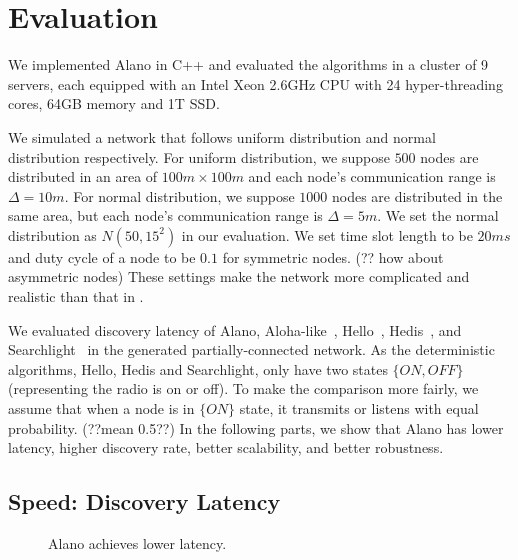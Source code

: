 \section{Evaluation}
\label{Evaluation}


We implemented Alano in C++ and evaluated the algorithms in a cluster of 9 servers,
each equipped with an Intel Xeon 2.6GHz CPU with 24 hyper-threading cores, 64GB memory and 1T SSD.

We simulated a network that follows uniform distribution and normal distribution respectively.
For uniform distribution, we suppose $500$ nodes are distributed in an area of $100m \times 100m$ and each node's communication range is $\Delta = 10m$. For normal distribution, we suppose $1000$ nodes are distributed in the same area, but each node's communication range is $\Delta = 5m$. We set the normal distribution as $N(50,15^2)$ in our evaluation.
We set time slot length to be $20ms$ and duty cycle of a node to be $0.1$ for symmetric nodes.
(?? how about asymmetric nodes)
These settings make the network more complicated and realistic than that in
\cite{wang2015blinddate, qiu2016talk, sun2014hello, bakht2012searchlight,
chen2015heterogeneous, kandhalu2010u, you2011aloha,
mcglynn2001birthday, song2014probabilistic, vasudevan2009neighbor}.



We evaluated discovery latency of Alano, Aloha-like~\cite{you2011aloha}, Hello~\cite{sun2014hello}, Hedis~\cite{chen2015heterogeneous}, and Searchlight~\cite{bakht2012searchlight} in the generated partially-connected network. 
As the deterministic algorithms, Hello, Hedis and Searchlight, only have two states $\{ON, OFF\}$ (representing the radio is on or off). To make the comparison more fairly, we assume that when a node is in $\{ON\}$ state, it transmits or listens with equal probability. (??mean 0.5??)
In the following parts, we show that Alano has lower latency, higher discovery rate, better scalability, and better robustness.

\subsection{Speed: Discovery Latency}

\begin{figure}[!h]
\centering
{}
\hspace{0.01in}
\caption{Alano achieves lower latency.}
\label{fig_latency}
\end{figure}

